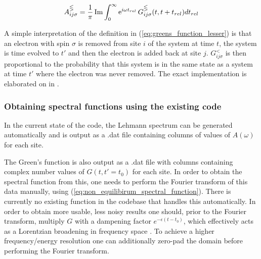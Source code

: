 \begin{equation}
    A_{ij\sigma}^\gtlt = \frac{1}{\pi} \operatorname{Im}\int_0^\infty \operatorname{e}^{i\omega t_{rel}} G_{ij\sigma}^\gtlt (t,t+t_{rel}) dt_{rel}\label{eq:non_equilibirum_spectral_function}
\end{equation}

A simple interpretation of the definition in (\ref{eq:greens_function_lesser}) is that an electron with spin $\sigma$ is removed from site $i$ of the system at time $t$, the system is time evolved to $t'$ and then the electron is added back at site $j$. $G_{ij\sigma}^{<}$ is then proportional to the probability that this system is in the same state as a system at time $t'$ where the electron was never removed. The exact implementation is elaborated on in \cite{worm_bachelor}. 

\subsubsection{Obtaining spectral functions using the existing code}

In the current state of the code, the Lehmann spectrum can be generated automatically and is output as a .dat file containing columns of values of $A(\omega)$ for each site.

\bigskip
The Green's function is also output as a .dat file with columns containing complex number values of $G(t,t'=t_0)$ for each site. In order to obtain the spectral function from this, one needs to perform the Fourier transform of this data manually, using (\ref{eq:non_equilibirum_spectral_function}). There is currently no existing function in the codebase that handles this automatically. In order to obtain more usable, less noisy results one should, prior to the Fourier transform, multiply $G$ with a dampening factor $e^{-\epsilon (t-t_0)}$, which effectively acts as a Lorentzian broadening in frequency space \cite{spectral_function}. To achieve a higher frequency/energy resolution one can additionally zero-pad the domain before performing the Fourier transform. 